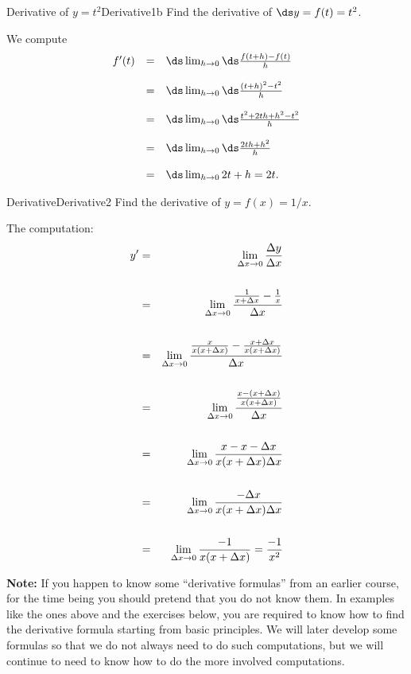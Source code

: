 \begin{example}{Derivative of $y=t^2$}{Derivative1b}
Find the derivative of $\ds y=f(t)=t^2$.
\end{example}

\begin{solution} 
We compute 
\[ \begin{array}{rll}
f'(t) &=& \ds\lim_{h\to0}\ds\frac{f(t+h)-f(t)}{h}  \\
\\
	&=&\ds\lim_{h\to0}\ds\frac{(t+h)^2-t^2}{h} \\
	\\
&=&\ds\lim_{h\to0}\ds\frac{t^2+2th+h^2-t^2}{h} \\
\\
&=&\ds\lim_{h\to0}\ds\frac{2th+h^2}{h} \\
\\
&=&\ds\lim_{h\to0} 2t+h=2t. \\
\end{array}\]
\end{solution}

\begin{example}{Derivative}{Derivative2}
Find the derivative of $y=f(x)=1/x$.
\end{example}

\begin{solution} 
The computation:
\begin{eqnarray*}
y' &=& \lim_{\Delta x\to0}{\Delta y\over\Delta x}\cr
\\
&=&\lim_{\Delta x\to0}{ {1\over x+\Delta x} - {1\over x}\over \Delta
  x}\cr
\\
&=&\lim_{\Delta x\to0}{ {x\over x(x+\Delta x)} - 
{x+\Delta x\over x(x+\Delta x)}\over \Delta x}\cr
\\
&=&\lim_{\Delta x\to0}{ {x-(x+\Delta x)\over x(x+\Delta x)}\over \Delta x}\cr
\\
&=&\lim_{\Delta x\to0} {x-x-\Delta x\over x(x+\Delta x)\Delta x}\cr
\\
&=&\lim_{\Delta x\to0} {-\Delta x\over x(x+\Delta x)\Delta x}\cr
\\
&=&\lim_{\Delta x\to0} {-1\over x(x+\Delta x)}={-1\over x^2}\cr
\end{eqnarray*}
\end{solution}

{\bf Note:}  If you happen to know some ``derivative formulas'' from
an earlier course, for the time being you should pretend that you do
not know them.
In examples like the ones above and the exercises below, you are required
to know how to find the derivative formula starting from basic principles.
We will later develop some formulas so that we do not always need to
do such computations, but we will continue to need to know how to do
the more involved computations.

